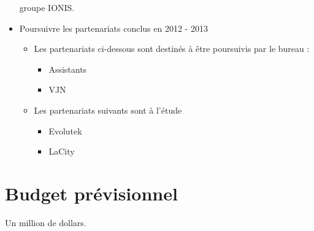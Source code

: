 \documentclass[12pt]{report}
\begin{document}
\begin{itemize}
      groupe IONIS.
    \item Poursuivre les partenariats conclus en 2012 - 2013
      \begin{itemize}
        \item Les partenariats ci-dessous sont destinés à être poursuivis par le bureau :
        \begin{itemize}
          \item Assistants
          \item VJN
        \end{itemize}
      \item Les partenariats suivants sont à l'étude
        \begin{itemize}
          \item Evolutek
          \item LaCity
        \end{itemize}
      \end{itemize}
  \end{itemize}
  \section{Budget prévisionnel}
  Un million de dollars.
\end{document}
